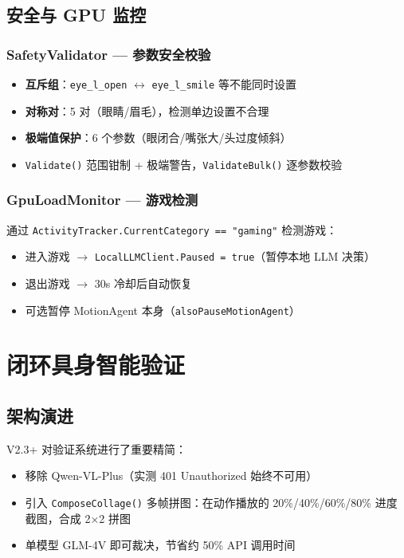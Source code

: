 \documentclass[12pt,a4paper]{ctexart}
\begin{document}
\subsection{安全与 GPU 监控}

\subsubsection{SafetyValidator --- 参数安全校验}

\begin{itemize}
    \item \textbf{互斥组}：\texttt{eye\_l\_open} $\leftrightarrow$ \texttt{eye\_l\_smile} 等不能同时设置
    \item \textbf{对称对}：5 对（眼睛/眉毛），检测单边设置不合理
    \item \textbf{极端值保护}：6 个参数（眼闭合/嘴张大/头过度倾斜）
    \item \texttt{Validate()} 范围钳制 + 极端警告，\texttt{ValidateBulk()} 逐参数校验
\end{itemize}

\subsubsection{GpuLoadMonitor --- 游戏检测}

通过 \texttt{ActivityTracker.CurrentCategory == "gaming"} 检测游戏：
\begin{itemize}
    \item 进入游戏 $\rightarrow$ \texttt{LocalLLMClient.Paused = true}（暂停本地 LLM 决策）
    \item 退出游戏 $\rightarrow$ 30s 冷却后自动恢复
    \item 可选暂停 MotionAgent 本身（\texttt{alsoPauseMotionAgent}）
\end{itemize}

\section{闭环具身智能验证}

\subsection{架构演进}

V2.3+ 对验证系统进行了重要精简：

\begin{itemize}
    \item 移除 Qwen-VL-Plus（实测 401 Unauthorized 始终不可用）
    \item 引入 \texttt{ComposeCollage()} 多帧拼图：在动作播放的 20\%/40\%/60\%/80\% 进度截图，合成 2×2 拼图
    \item 单模型 GLM-4V 即可裁决，节省约 50\% API 调用时间
\end{itemize}
\end{document}
